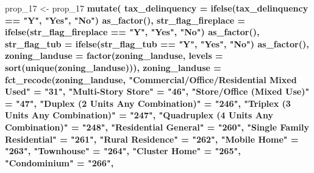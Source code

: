 \documentclass[]{book}
\newenvironment{Shaded}{\begin{snugshade}}{\end{snugshade}}
\newcommand{\KeywordTok}[1]{\textcolor[rgb]{0.13,0.29,0.53}{\textbf{#1}}}
\newcommand{\DataTypeTok}[1]{\textcolor[rgb]{0.13,0.29,0.53}{#1}}
\newcommand{\DecValTok}[1]{\textcolor[rgb]{0.00,0.00,0.81}{#1}}
\newcommand{\StringTok}[1]{\textcolor[rgb]{0.31,0.60,0.02}{#1}}
\newcommand{\OperatorTok}[1]{\textcolor[rgb]{0.81,0.36,0.00}{\textbf{#1}}}
\newcommand{\NormalTok}[1]{#1}
\theoremstyle{definition}
\theoremstyle{definition}
\theoremstyle{definition}
\theoremstyle{remark}
\begin{document}
\begin{Shaded}
\begin{Highlighting}[]
{{{{\NormalTok{prop_}\DecValTok{17}\NormalTok{ <-}\StringTok{ }\NormalTok{prop_}\DecValTok{17} \OperatorTok{%
\StringTok{  }\KeywordTok{mutate}\NormalTok{(}
    \DataTypeTok{tax_delinquency =} \KeywordTok{ifelse}\NormalTok{(tax_delinquency }\OperatorTok{==}\StringTok{ "Y"}\NormalTok{, }\StringTok{"Yes"}\NormalTok{, }\StringTok{"No"}\NormalTok{) }\OperatorTok{%
\StringTok{      }\KeywordTok{as_factor}\NormalTok{(),}
    \DataTypeTok{str_flag_fireplace =} \KeywordTok{ifelse}\NormalTok{(str_flag_fireplace }\OperatorTok{==}\StringTok{ "Y"}\NormalTok{, }\StringTok{"Yes"}\NormalTok{, }\StringTok{"No"}\NormalTok{) }\OperatorTok{%
\StringTok{      }\KeywordTok{as_factor}\NormalTok{(),}
    \DataTypeTok{str_flag_tub =} \KeywordTok{ifelse}\NormalTok{(str_flag_tub }\OperatorTok{==}\StringTok{ "Y"}\NormalTok{, }\StringTok{"Yes"}\NormalTok{, }\StringTok{"No"}\NormalTok{) }\OperatorTok{%
\StringTok{      }\KeywordTok{as_factor}\NormalTok{(),}
    \DataTypeTok{zoning_landuse =} \KeywordTok{factor}\NormalTok{(zoning_landuse, }\DataTypeTok{levels =} \KeywordTok{sort}\NormalTok{(}\KeywordTok{unique}\NormalTok{(zoning_landuse))),}
    \DataTypeTok{zoning_landuse =} \KeywordTok{fct_recode}\NormalTok{(zoning_landuse,}
      \StringTok{"Commercial/Office/Residential Mixed Used"}\NormalTok{ =}\StringTok{ "31"}\NormalTok{, }
      \StringTok{"Multi-Story Store"}\NormalTok{                        =}\StringTok{ "46"}\NormalTok{,}
      \StringTok{"Store/Office (Mixed Use)"}\NormalTok{                 =}\StringTok{ "47"}\NormalTok{,}
      \StringTok{"Duplex (2 Units Any Combination)"}\NormalTok{         =}\StringTok{ "246"}\NormalTok{,}
      \StringTok{"Triplex (3 Units Any Combination)"}\NormalTok{        =}\StringTok{ "247"}\NormalTok{,}
      \StringTok{"Quadruplex (4 Units Any Combination)"}\NormalTok{     =}\StringTok{ "248"}\NormalTok{,}
      \StringTok{"Residential General"}\NormalTok{                      =}\StringTok{ "260"}\NormalTok{,}
      \StringTok{"Single Family Residential"}\NormalTok{                =}\StringTok{ "261"}\NormalTok{,}
      \StringTok{"Rural Residence"}\NormalTok{                          =}\StringTok{ "262"}\NormalTok{,}
      \StringTok{"Mobile Home"}\NormalTok{                              =}\StringTok{ "263"}\NormalTok{,}
      \StringTok{"Townhouse"}\NormalTok{                                =}\StringTok{ "264"}\NormalTok{,}
      \StringTok{"Cluster Home"}\NormalTok{                             =}\StringTok{ "265"}\NormalTok{,}
      \StringTok{"Condominium"}\NormalTok{                              =}\StringTok{ "266"}\NormalTok{,}
}}}}}}}}
\end{Highlighting}
\end{Shaded}
\end{document}
